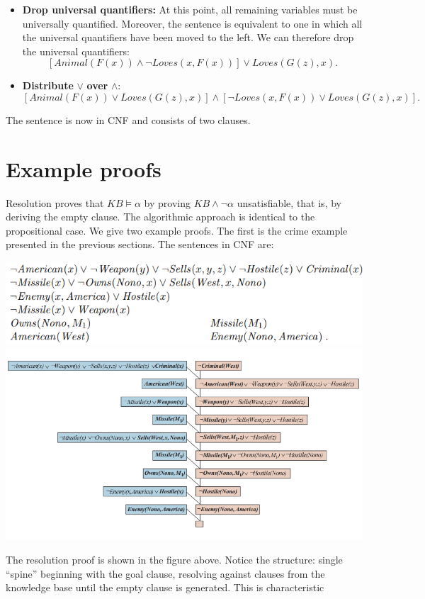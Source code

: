 \begin{itemize}
    \item \textbf{Drop universal quantifiers:}  At this point, all remaining variables must be universally quantified. Moreover, the sentence is equivalent to one in which all the universal quantifiers have been moved to the left. We can therefore drop the universal quantifiers:
    \[[Animal(F(x)) \land \neg Loves(x, F(x))] \lor Loves(G(z), x) .\]


    \item \textbf{Distribute} $\lor$ \textbf{over} $\land$:
    \[[Animal(F(x)) \lor Loves(G(z), x)] \land [\neg Loves(x, F(x)) \lor Loves(G(z), x)].\]
\end{itemize}
The sentence is now in CNF and consists of two clauses.

\section{Example proofs}
Resolution proves that $KB \vDash \alpha$ by proving $KB \land \neg \alpha$ unsatisfiable, that is, by deriving the empty clause. The algorithmic approach is identical to the propositional case. We give two example proofs. The first is the crime example presented in the previous sections. The sentences in CNF are:
\begin{center}
    \includegraphics[]{images/crime-cnf.png}
    \includegraphics[]{images/resolution-crime-fol.png}
\end{center}
The resolution proof is shown in the figure above. Notice the structure: single “spine” beginning with the goal clause, resolving against clauses from the knowledge base until the empty clause is generated. This is characteristic
